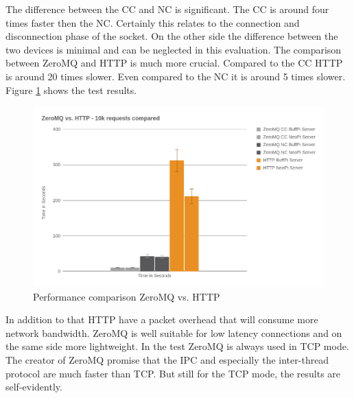 The difference between the \ac{CC} and \ac{NC} is significant.
The \ac{CC} is around four times faster then the \ac{NC}.
Certainly this relates to the connection and disconnection phase of the socket.
On the other side the difference between the two devices is minimal and can be neglected in this evaluation.
The comparison between ZeroMQ and \ac{HTTP} is much more crucial.
Compared to the \ac{CC} \ac{HTTP} is around 20 times slower.
Even compared to the \ac{NC} it is around 5 times slower.
Figure \ref{fig:performance_zeromq_vs_http} shows the test results.

\begin{figure}[H]
    \centering
    \includegraphics[width=\textwidth]{resources/images/performance_zeromq_vs_http.png}
    \caption[Performance comparison ZeroMQ vs. HTTP]{Performance comparison ZeroMQ vs. HTTP}
    \label{fig:performance_zeromq_vs_http}
\end{figure}

In addition to that \ac{HTTP} have a packet overhead that will consume more network bandwidth.
ZeroMQ is well suitable for low latency connections and on the same side more lightweight.
In the test ZeroMQ is always used in \ac{TCP} mode.
The creator of ZeroMQ promise that the \ac{IPC} and especially the inter-thread protocol are much faster than \ac{TCP}.\autocite[cf.]{ZeroMQ:UicastTransports}
But still for the \ac{TCP} mode, the results are self-evidently.



